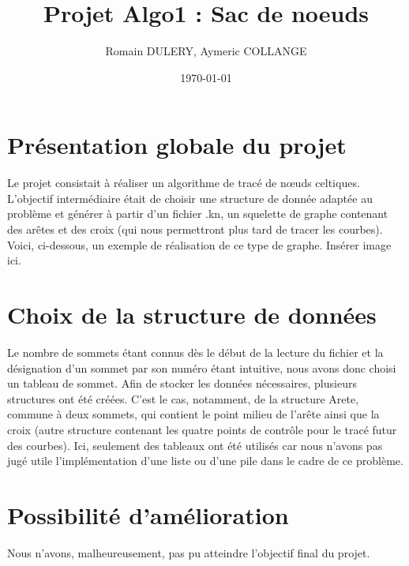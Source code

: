\documentclass[a4paper,11pt]{article}
\title{Projet Algo1 : Sac de noeuds}
\author{Romain DULERY, Aymeric COLLANGE}
\date{\today}
\begin{document}
\maketitle

\section{Présentation globale du projet}

Le projet consistait à réaliser un algorithme de tracé de nœuds celtiques.
L'objectif intermédiaire était de choisir une structure de donnée adaptée au problème et générer à partir d'un fichier .kn, un squelette de graphe contenant des arêtes et des croix (qui nous permettront  plus tard de tracer les courbes).
Voici, ci-dessous, un exemple de réalisation de ce type de graphe.
Insérer image ici.

\section{Choix de la structure de données}

Le nombre de sommets étant connus dès le début de la lecture du fichier et la désignation d'un sommet par son numéro étant intuitive, nous avons donc choisi un tableau de sommet.
Afin de stocker les données nécessaires, plusieurs structures ont été créées. C'est le cas, notamment, de la structure Arete, commune à deux sommets, qui contient le point milieu de l'arête ainsi que la croix (autre structure contenant les quatre points de contrôle pour le tracé futur des courbes).
Ici, seulement des tableaux ont été utilisés car nous n'avons pas jugé utile l'implémentation d'une liste ou d'une pile dans le cadre de ce problème.

\section{Possibilité d'amélioration}

Nous n'avons, malheureusement, pas pu atteindre l'objectif final du projet.
\end{document}
